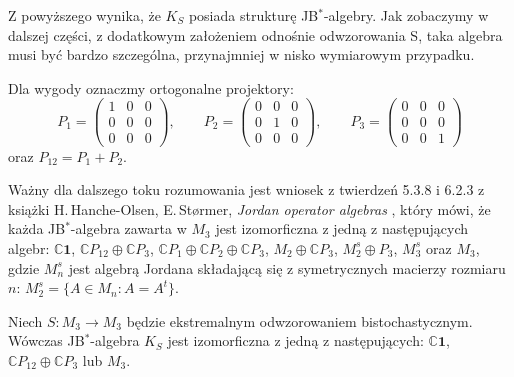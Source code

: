 {Z powyższego wynika, że $K_{S}$ posiada strukturę JB$^{*}$-algebry.
Jak zobaczymy w dalszej części,
z dodatkowym założeniem odnośnie odwzorowania S,
taka algebra musi być bardzo szczególna,
przynajmniej w nisko wymiarowym przypadku.

Dla wygody oznaczmy ortogonalne projektory:
\begin{equation}
\label{def:OrthogonalProjections}
    P_{1} = \begin{pmatrix}
        1 & 0 & 0 \\
        0 & 0 & 0 \\
        0 & 0 & 0
    \end{pmatrix} , \quad \quad
    P_{2} = \begin{pmatrix}
        0 & 0 & 0 \\
        0 & 1 & 0 \\
        0 & 0 & 0
    \end{pmatrix} , \quad \quad
    P_{3} = \begin{pmatrix}
        0 & 0 & 0 \\
        0 & 0 & 0 \\
        0 & 0 & 1
    \end{pmatrix}
\end{equation}
oraz $P_{12} = P_{1} + P_{2}$.

Ważny dla dalszego toku rozumowania jest wniosek z twierdzeń 5.3.8 i 6.2.3
z książki
H.\,Hanche-Olsen, E.\,St{\o}rmer,
\emph{Jordan operator algebras} \cite{Hanche1984},
który mówi, że każda JB$^{*}$-algebra zawarta w $M_{3}$
jest izomorficzna z jedną z następujących algebr:
$\mathbb{C}\mathbf{1}$,
$\mathbb{C} P_{12} \oplus \mathbb{C} P_{3}$,
$\mathbb{C} P_{1} \oplus \mathbb{C} P_{2} \oplus \mathbb{C} P_{3}$,
$M_{2} \oplus \mathbb{C} P_{3}$,
$M_{2}^{s} \oplus P_{3}$,
$M_{3}^{s}$ oraz $M_{3}$,
gdzie $M_{n}^{s}$ jest algebrą Jordana składającą się z symetrycznych
macierzy rozmiaru $n$: $M_{2}^{s} = \{ A \in M_{n}: A = A^{t} \}$.

\begin{Theorem}
\label{thm:ExposedMaps}
Niech $S\!: M_{3} \rightarrow M_{3}$ będzie ekstremalnym odwzorowaniem
bistochastycznym.
Wówczas JB$^{*}$-algebra $K_{S}$ jest izomorficzna z jedną z następujących:
$\mathbb{C}\mathbf{1}$, $\mathbb{C} P_{12} \oplus \mathbb{C} P_{3}$
lub
$M_{3}$.
\end{Theorem}

}
